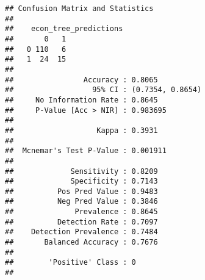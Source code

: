 \documentclass[
]{article}
\newenvironment{Shaded}{\begin{snugshade}}{\end{snugshade}}
\newcommand{\AttributeTok}[1]{\textcolor[rgb]{0.77,0.63,0.00}{#1}}
\newcommand{\CommentTok}[1]{\textcolor[rgb]{0.56,0.35,0.01}{\textit{#1}}}
\newcommand{\FunctionTok}[1]{\textcolor[rgb]{0.00,0.00,0.00}{#1}}
\newcommand{\NormalTok}[1]{#1}
\newcommand{\OtherTok}[1]{\textcolor[rgb]{0.56,0.35,0.01}{#1}}
\newcommand{\SpecialCharTok}[1]{\textcolor[rgb]{0.00,0.00,0.00}{#1}}
\newcommand{\StringTok}[1]{\textcolor[rgb]{0.31,0.60,0.02}{#1}}
\begin{document}
\begin{Shaded}
\end{Shaded}

\begin{verbatim}
## Confusion Matrix and Statistics
## 
##    econ_tree_predictions
##       0   1
##   0 110   6
##   1  24  15
##                                           
##                Accuracy : 0.8065          
##                  95% CI : (0.7354, 0.8654)
##     No Information Rate : 0.8645          
##     P-Value [Acc > NIR] : 0.983695        
##                                           
##                   Kappa : 0.3931          
##                                           
##  Mcnemar's Test P-Value : 0.001911        
##                                           
##             Sensitivity : 0.8209          
##             Specificity : 0.7143          
##          Pos Pred Value : 0.9483          
##          Neg Pred Value : 0.3846          
##              Prevalence : 0.8645          
##          Detection Rate : 0.7097          
##    Detection Prevalence : 0.7484          
##       Balanced Accuracy : 0.7676          
##                                           
##        'Positive' Class : 0               
## 
\end{verbatim}

\begin{Shaded}
\end{Shaded}
\end{document}
